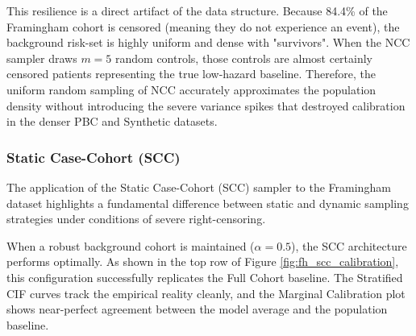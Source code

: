 \documentclass[a4paper,twoside,12pt]{report}
\begin{document}
This resilience is a direct artifact of the data structure. Because 84.4\% of the Framingham cohort is censored (meaning they do not experience an event), the background risk-set is highly uniform and dense with "survivors". When the NCC sampler draws $m=5$ random controls, those controls are almost certainly censored patients representing the true low-hazard baseline. Therefore, the uniform random sampling of NCC accurately approximates the population density without introducing the severe variance spikes that destroyed calibration in the denser PBC and Synthetic datasets.


\subsubsection{Static Case-Cohort (SCC)}

The application of the Static Case-Cohort (SCC) sampler to the Framingham dataset highlights a fundamental difference between static and dynamic sampling strategies under conditions of severe right-censoring. 

When a robust background cohort is maintained ($\alpha=0.5$), the SCC architecture performs optimally. As shown in the top row of Figure \ref{fig:fh_scc_calibration}, this configuration successfully replicates the Full Cohort baseline. The Stratified CIF curves track the empirical reality cleanly, and the Marginal Calibration plot shows near-perfect agreement between the model average and the population baseline.
\end{document}
